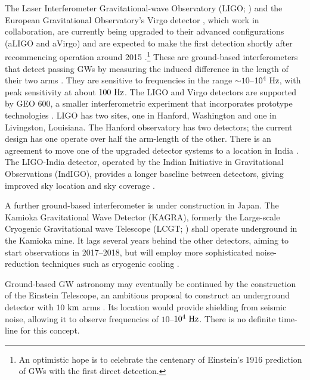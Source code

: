 The Laser Interferometer Gravitational-wave Observatory (LIGO; \citealt{Abramovici1992}) and the European Gravitational Observatory's Virgo detector \citep{Acernese2008a}, which work in collaboration, are currently being upgraded to their advanced configurations (aLIGO and aVirgo) and are expected to make the first detection shortly after recommencing operation around 2015 \citep{Harry2010,Accadia2011}.\footnote{An optimistic hope is to celebrate the centenary of Einstein's 1916 prediction of GWs \citep[document 32]{Einstein1997} with the first direct detection.} These are ground-based interferometers that detect passing GWs by measuring the induced difference in the length of their two arms \citep{Pitkin2011}. They are sensitive to frequencies in the range $\sim10$--$10^4~\mathrm{Hz}$, with peak sensitivity at about $100~\mathrm{Hz}$. The LIGO and Virgo detectors are supported by GEO 600, a smaller interferometric experiment that incorporates prototype technologies \citep{Willke2002,Willke2006}. LIGO has two sites, one in Hanford, Washington and one in Livingston, Louisiana. The Hanford observatory has two detectors; the current design has one operate over half the arm-length of the other. There is an agreement to move one of the upgraded detector systems to a location in India \citep{Unnikrishnan2013}. The LIGO-India detector, operated by the Indian Initiative in Gravitational Observations (IndIGO), provides a longer baseline between detectors, giving improved sky location and sky coverage \citep{Schutz2011}.

A further ground-based interferometer is under construction in Japan. The Kamioka Gravitational Wave Detector (KAGRA), formerly the Large-scale Cryogenic Gravitational wave Telescope (LCGT; \citealt{Kuroda1999,Kuroda2010}) shall operate underground in the Kamioka mine. It lags several years behind the other detectors, aiming to start observations in 2017--2018, but will employ more sophisticated noise-reduction techniques such as cryogenic cooling \citep{Somiya2012}.

Ground-based GW astronomy may eventually be continued by the construction of the Einstein Telescope, an ambitious proposal to construct an underground detector with $10~\mathrm{km}$ arms \citep{Punturo2010,Hild2011,Sathyaprakash2012}. Its location would provide shielding from seismic noise, allowing it to observe frequencies of $10$--$10^4~\mathrm{Hz}$. There is no definite time-line for this concept.

